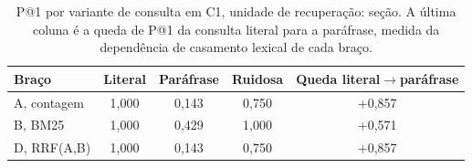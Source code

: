 \begin{table}[htb]
\centering
\caption{P@1 por variante de consulta em C1, unidade de recuperação: seção. A última coluna é a queda de P@1 da consulta literal para a paráfrase, medida da dependência de casamento lexical de cada braço.}
\label{tab:retrieval-variants-section}
\begin{tabular}{lcccc}
\toprule
Braço & Literal & Paráfrase & Ruidosa & Queda literal$\rightarrow$paráfrase \\
\midrule
A, contagem & 1{,}000 & 0{,}143 & 0{,}750 & +0{,}857 \\
B, BM25 & 1{,}000 & 0{,}429 & 1{,}000 & +0{,}571 \\
D, RRF(A,B) & 1{,}000 & 0{,}143 & 0{,}750 & +0{,}857 \\
\bottomrule
\end{tabular}
\end{table}
